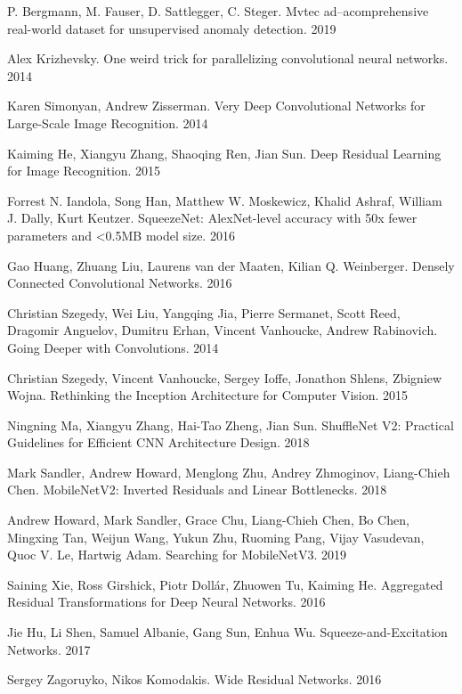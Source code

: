 \documentclass{article}
\begin{document}
\begin{large}
\begin{thebibliography}{3}
	P. Bergmann, M. Fauser, D. Sattlegger, C. Steger.
	Mvtec ad–acomprehensive real-world dataset for unsupervised anomaly detection. 2019
	
	Alex Krizhevsky.
	One weird trick for parallelizing convolutional neural networks. 2014
	
	Karen Simonyan, Andrew Zisserman.
	Very Deep Convolutional Networks for Large-Scale Image Recognition. 2014
	
	Kaiming He, Xiangyu Zhang, Shaoqing Ren, Jian Sun.
	Deep Residual Learning for Image Recognition. 2015
	
	Forrest N. Iandola, Song Han, Matthew W. Moskewicz, Khalid Ashraf, William J. Dally, Kurt Keutzer.
	SqueezeNet: AlexNet-level accuracy with 50x fewer parameters and <0.5MB model size. 2016
	
	Gao Huang, Zhuang Liu, Laurens van der Maaten, Kilian Q. Weinberger.
	Densely Connected Convolutional Networks. 2016
	
	Christian Szegedy, Wei Liu, Yangqing Jia, Pierre Sermanet, Scott Reed, Dragomir Anguelov, Dumitru Erhan, Vincent Vanhoucke, Andrew Rabinovich.
	Going Deeper with Convolutions. 2014
	
	Christian Szegedy, Vincent Vanhoucke, Sergey Ioffe, Jonathon Shlens, Zbigniew Wojna.
	Rethinking the Inception Architecture for Computer Vision. 2015
	
	Ningning Ma, Xiangyu Zhang, Hai-Tao Zheng, Jian Sun.
	ShuffleNet V2: Practical Guidelines for Efficient CNN Architecture Design. 2018
	
	Mark Sandler, Andrew Howard, Menglong Zhu, Andrey Zhmoginov, Liang-Chieh Chen.
	MobileNetV2: Inverted Residuals and Linear Bottlenecks. 2018
	
	Andrew Howard, Mark Sandler, Grace Chu, Liang-Chieh Chen, Bo Chen, Mingxing Tan, Weijun Wang, Yukun Zhu, Ruoming Pang, Vijay Vasudevan, Quoc V. Le, Hartwig Adam.
	Searching for MobileNetV3. 2019
	
	Saining Xie, Ross Girshick, Piotr Dollár, Zhuowen Tu, Kaiming He.
	Aggregated Residual Transformations for Deep Neural Networks. 2016
	
	Jie Hu, Li Shen, Samuel Albanie, Gang Sun, Enhua Wu.
	Squeeze-and-Excitation Networks. 2017
	
	Sergey Zagoruyko, Nikos Komodakis.
	Wide Residual Networks. 2016
	

\end{thebibliography}
\end{large}
\end{document}
